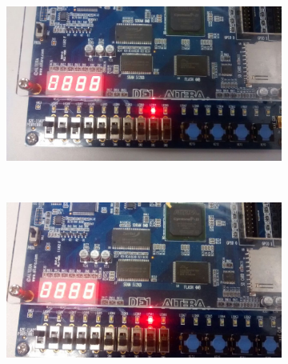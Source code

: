 \begin{figure}
	\begin{subfigure}[b]{0.44\textwidth}
        \includegraphics[width=\textwidth]{img/cenario2/circ5}
        \label{fig:circ5}
    \end{subfigure}
    ~
    \begin{subfigure}[b]{0.44\textwidth}
        \includegraphics[width=\textwidth]{img/cenario2/circ6}
        \label{fig:circ6}
    \end{subfigure}


\end{figure}
